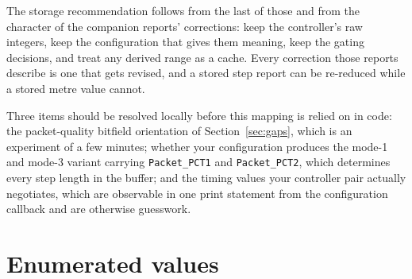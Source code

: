 \documentclass[11pt,a4paper]{article}
\newcommand{\code}[1]{\texttt{\small #1}}
\begin{document}
The storage recommendation follows from the last of those and from the character of the companion
reports' corrections: keep the controller's raw integers, keep the configuration that gives them
meaning, keep the gating decisions, and treat any derived range as a cache. Every correction those
reports describe is one that gets revised, and a stored step report can be re-reduced while a stored
metre value cannot.

Three items should be resolved locally before this mapping is relied on in code: the packet-quality
bitfield orientation of Section~\ref{sec:gaps}, which is an experiment of a few minutes; whether
your configuration produces the mode-1 and mode-3 variant carrying \code{Packet\_\allowbreak{}PCT1} and
\code{Packet\_\allowbreak{}PCT2}, which determines every step length in the buffer; and the timing values
your controller pair actually negotiates, which are observable in one print statement from the
configuration callback and are otherwise guesswork.

\appendix
\section{Enumerated values}
\end{document}
